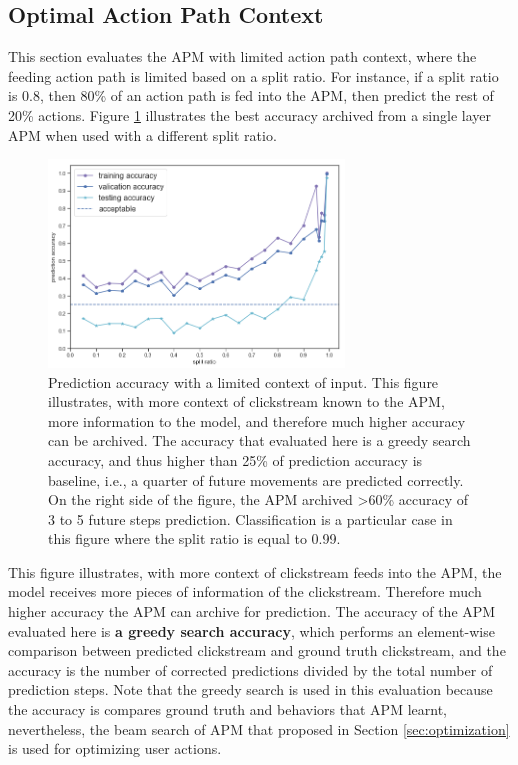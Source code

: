 \subsection{Optimal Action Path Context}
\label{sec:eval-optimal}

This section evaluates the APM with limited action path context, where the feeding action path
is limited based on a split ratio. 
For instance, if a split ratio is 0.8, then 80\% of an action path is fed into the APM, 
then predict the rest of 20\% actions. Figure \ref{fig:acc} illustrates the best accuracy 
archived from a single layer APM when used with a different split ratio.

\begin{figure}
    \centering
    \includegraphics[width=0.7\textwidth]{figures/acc}
    \caption{Prediction accuracy with a limited context of input. This figure illustrates, with more context of clickstream
    known to the APM, more information to the model, and therefore much higher accuracy can be archived.
    The accuracy that evaluated here is a greedy search accuracy, and thus higher than 25\% of prediction accuracy is baseline,
    i.e., a quarter of future movements are predicted correctly.
    On the right side of the figure, the APM archived >60\% accuracy of 3 to 5 future steps prediction.
    Classification is a particular case in this figure where the split ratio is equal to 0.99.}
    \label{fig:acc}
\end{figure}

This figure illustrates, with more context of clickstream
feeds into the APM, the model receives more pieces of information of the clickstream.
Therefore much higher accuracy the APM can archive for prediction.
The accuracy of the APM evaluated here is \textbf{a greedy search accuracy}, which performs an element-wise comparison
between predicted clickstream and ground truth clickstream, and the accuracy is the number of
corrected predictions divided by the total number of prediction steps. 
Note that the greedy search is
used in this evaluation because the accuracy is compares ground truth and behaviors that APM learnt,
nevertheless, the beam search of APM that proposed in Section \ref{sec:optimization} is used for optimizing user
actions.

